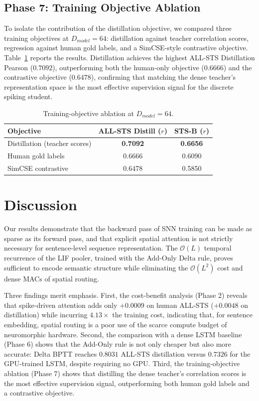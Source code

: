 \documentclass[11pt, conference, compsoc, twoside]{IEEEtran}
\begin{document}
\subsection{Phase 7: Training Objective Ablation}
To isolate the contribution of the distillation objective, we compared three training objectives at $D_{model}=64$: distillation against teacher correlation scores, regression against human gold labels, and a SimCSE-style contrastive objective. Table~\ref{tab:objective_ablation} reports the results. Distillation achieves the highest ALL-STS Distillation Pearson ($0.7092$), outperforming both the human-only objective ($0.6666$) and the contrastive objective ($0.6478$), confirming that matching the dense teacher's representation space is the most effective supervision signal for the discrete spiking student.

\begin{table}[t]
\begin{center}
{\caption{Training-objective ablation at $D_{model}=64$.}\label{tab:objective_ablation}}


\begin{tabular}{lcc}
\toprule
\textbf{Objective} & \textbf{ALL-STS Distill ($r$)} & \textbf{STS-B ($r$)} \\
\midrule
Distillation (teacher scores) & \textbf{0.7092} & \textbf{0.6656} \\
Human gold labels & 0.6666 & 0.6090 \\
SimCSE contrastive & 0.6478 & 0.5850 \\
\bottomrule
\end{tabular}
\end{center}
\end{table}


\section{Discussion}
Our results demonstrate that the backward pass of SNN training can be made as sparse as its forward pass, and that explicit spatial attention is not strictly necessary for sentence-level sequence representation. The $\mathcal{O}(L)$ temporal recurrence of the LIF pooler, trained with the Add-Only Delta rule, proves sufficient to encode semantic structure while eliminating the $\mathcal{O}(L^2)$ cost and dense MACs of spatial routing.

Three findings merit emphasis. First, the cost-benefit analysis (Phase 2) reveals that spike-driven attention adds only $+0.0009$ on human ALL-STS ($+0.0048$ on distillation) while incurring $4.13\times$ the training cost, indicating that, for sentence embedding, spatial routing is a poor use of the scarce compute budget of neuromorphic hardware. Second, the comparison with a dense LSTM baseline (Phase 6) shows that the Add-Only rule is not only cheaper but also more accurate: Delta BPTT reaches $0.8031$ ALL-STS distillation versus $0.7326$ for the GPU-trained LSTM, despite requiring no GPU. Third, the training-objective ablation (Phase 7) shows that distilling the dense teacher's correlation scores is the most effective supervision signal, outperforming both human gold labels and a contrastive objective.
\end{document}
